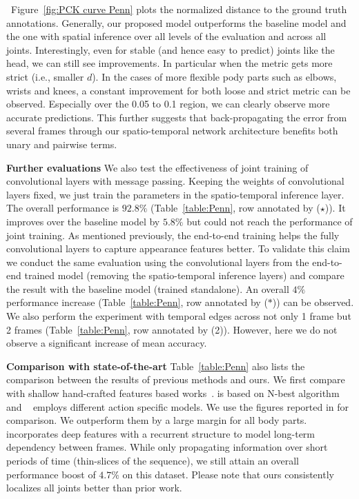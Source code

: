 \documentclass[10pt,twocolumn,letterpaper]{article}
\newcommand{\figref}[1]{Figure~\ref{#1}}
\begin{document}
~\figref{fig:PCK curve Penn} plots the normalized distance to the ground truth annotations. Generally, our proposed model outperforms the baseline model and the one with spatial inference over all levels of the evaluation and across all joints. Interestingly, even for stable (and hence easy to predict) joints like the head, we can still see improvements. In particular when the metric gets more strict (i.e., smaller $d$). In the cases of more flexible pody parts such as elbows, wrists and knees, a constant improvement for both loose and strict metric can be observed. Especially over the 0.05 to 0.1 region, we can clearly observe more accurate predictions. This further suggests that back-propagating the error from several frames through our spatio-temporal network architecture benefits both unary and pairwise terms.

\noindent\textbf{Further evaluations}
We also test the effectiveness of joint training of convolutional layers with message passing. Keeping the weights of convolutional layers fixed, we just train the parameters in the spatio-temporal inference layer. The overall performance is $92.8\%$ (Table~\ref{table:Penn}, row annotated by ($\star$)). It improves over the baseline model by $5.8\%$ but could not reach the performance of joint training.
As mentioned previously, the end-to-end training helps the fully convolutional layers to capture appearance features better. To validate this claim we conduct the same evaluation using the convolutional layers from the end-to-end trained model (removing the spatio-temporal inference layers) and compare the result with the baseline model (trained standalone). An overall $4\%$ performance increase (Table~\ref{table:Penn}, row annotated by ($\ast$)) can be observed.
We also perform the experiment with temporal edges across not only 1 frame but 2 frames (Table~\ref{table:Penn}, row annotated by (2)). However, here we do not observe a significant increase of mean accuracy.

\noindent\textbf{Comparison with state-of-the-art}
Table~\ref{table:Penn} also lists the comparison between the results of
previous methods and ours. We first compare with shallow hand-crafted features based works~\cite{xiaohan2015joint,park2011n}. \cite{park2011n} is based on N-best algorithm and ~\cite{xiaohan2015joint} employs different action specific models. We use the figures reported in \cite{xiaohan2015joint} for comparison. We outperform them by a large margin for all body parts. \cite{gkioxari2016chained} incorporates deep features with a recurrent structure to model long-term dependency between frames. While only propagating information over short periods of time (thin-slices of the sequence), we still attain an overall performance boost of $4.7\%$ on this dataset. Please note that ours consistently localizes all joints better than prior work.
\end{document}
